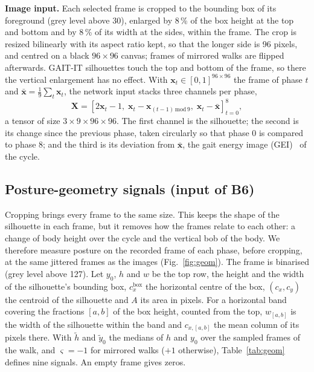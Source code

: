 \documentclass[conference]{IEEEtran}
\begin{document}
\textbf{Image input.} Each selected frame is cropped to the bounding box of its foreground (grey level above 30), enlarged by 8\,\% of the box height at the top and bottom and by 8\,\% of its width at the sides, within the frame. The crop is resized bilinearly with its aspect ratio kept, so that the longer side is 96 pixels, and centred on a black $96\times96$ canvas; frames of mirrored walks are flipped afterwards. GAIT-IT silhouettes touch the top and bottom of the frame, so there the vertical enlargement has no effect. With $\mathbf{x}_t\in[0,1]^{96\times96}$ the frame of phase $t$ and $\bar{\mathbf{x}}=\frac{1}{9}\sum_t\mathbf{x}_t$, the network input stacks three channels per phase,
\begin{equation}
\mathbf{X}=\left[2\mathbf{x}_t-1,\;\mathbf{x}_t-\mathbf{x}_{(t-1)\,\mathrm{mod}\,9},\;\mathbf{x}_t-\bar{\mathbf{x}}\right]_{t=0}^{8},
\label{eq:input}
\end{equation}
a tensor of size $3\times9\times96\times96$. The first channel is the silhouette; the second is its change since the previous phase, taken circularly so that phase 0 is compared to phase 8; and the third is its deviation from $\bar{\mathbf{x}}$, the gait energy image (GEI)~\cite{gei} of the cycle.

\subsection{Posture-geometry signals (input of B6)}
\label{sec:geom}

Cropping brings every frame to the same size. This keeps the shape of the silhouette in each frame, but it removes how the frames relate to each other: a change of body height over the cycle and the vertical bob of the body. We therefore measure posture on the recorded frame of each phase, before cropping, at the same jittered frames as the images (Fig.~\ref{fig:geom}). The frame is binarised (grey level above 127). Let $y_0$, $h$ and $w$ be the top row, the height and the width of the silhouette's bounding box, $c_x^{\mathrm{box}}$ the horizontal centre of the box, $(c_x,c_y)$ the centroid of the silhouette and $A$ its area in pixels. For a horizontal band covering the fractions $[a,b]$ of the box height, counted from the top, $w_{[a,b]}$ is the width of the silhouette within the band and $c_{x,[a,b]}$ the mean column of its pixels there. With $\tilde{h}$ and $\tilde{y}_0$ the medians of $h$ and $y_0$ over the sampled frames of the walk, and $\varsigma=-1$ for mirrored walks ($+1$ otherwise), Table~\ref{tab:geom} defines nine signals. An empty frame gives zeros.
\end{document}

